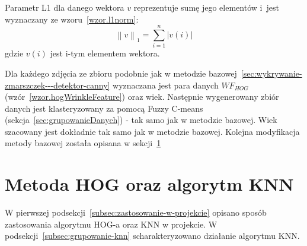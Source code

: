 \documentclass[a4paper,twoside,12pt]{book}
\begin{document}
    Parametr L1 dla danego wektora $v$ reprezentuje sumę jego elementów i~jest wyznaczany ze wzoru~\ref{wzor.l1norm}:
    \large
    \begin{equation}
        \left \|v  \right \|_{1} = \sum_{i=1}^{n}\left |v(i)  \right |
        \label{wzor.l1norm}
    \end{equation}
    \normalsize
    gdzie $v(i)$ jest i-tym elementem wektora.

    Dla każdego zdjęcia ze zbioru podobnie jak w metodzie bazowej~\ref{sec:wykrywanie-zmarszczek---detektor-canny}
    wyznaczana jest para danych $WF_{HOG}$ (wzór~\ref{wzor.hogWrinkleFeature}) oraz wiek. Następnie wygenerowany
    zbiór danych jest klasteryzowany za pomocą Fuzzy C-means (sekcja~\ref{sec:grupowanieDanych}) - tak samo jak w
    metodzie
    bazowej.
    Wiek szacowany jest dokładnie tak samo jak w metodzie bazowej.
    Kolejna modyfikacja metody bazowej została opisana w sekcji~\ref{sec:metoda-hog-oraz-algorytm-knn}
    \section{Metoda HOG oraz algorytm KNN}\label{sec:metoda-hog-oraz-algorytm-knn}
    W pierwszej podsekcji~\ref{subsec:zastosowanie-w-projekcie} opisano sposób zastosowania algorytmu HOG-a oraz KNN
    w projekcie.
    W podsekcji~\ref{subsec:grupowanie-knn} scharakteryzowano działanie algorytmu KNN.
\end{document}
